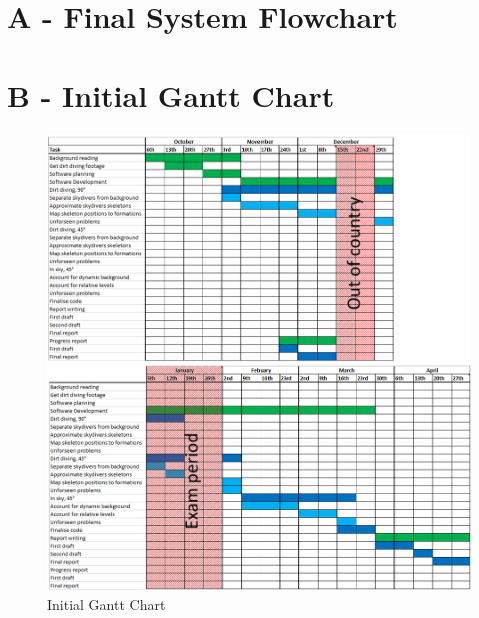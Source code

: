 \documentclass[a4paper, 12pt]{article}
\begin{document}
\begin{appendices}
%
\chapter{\textbf{A - Final System Flowchart}}
\label{appendix:system_flowchart}


\chapter{\textbf{B - Initial Gantt Chart}}
\label{appendix:initial_gantt}
%
\begin{figure}[H]
	\centering
	\includegraphics[width=\linewidth]{Gantt_initial_split.png}
	\caption{Initial Gantt Chart}
	\label{fig:gantt_initial}
\end{figure}
%

\end{appendices}
\end{document}
